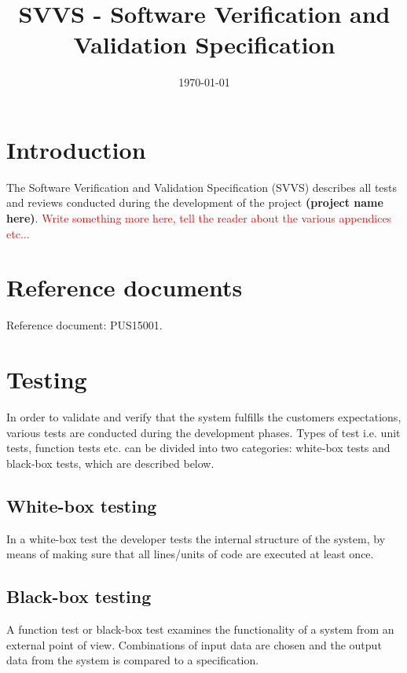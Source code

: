 \documentclass[a4paper]{article}
\title{SVVS - Software Verification and Validation Specification}
\date{\today}
\begin{document}
\maketitle


\pagebreak
\setcounter{tocdepth}{2}
\tableofcontents
\pagebreak

\section{Introduction}
The Software Verification and Validation Specification (SVVS) describes all tests and reviews conducted during the development of the project \textbf{(project name here)}. \textcolor{red}{Write something more here, tell  the reader about the various appendices etc...}

\section{Reference documents}
Reference document: PUS15001.

\section{Testing}
In order to validate and verify that the system fulfills the customers expectations, various tests are conducted during the development phases. Types of test i.e. unit tests, function tests etc. can be divided into two categories: white-box tests and black-box tests, which are described below.   

\subsection{White-box testing}
In a white-box test the developer tests the internal structure of the system, by means of making sure that all lines/units of code are executed at least once.

\subsection{Black-box testing}
A function test or black-box test examines the functionality of a system from an external point of view. Combinations of input data are chosen and the output data from the system is compared to a specification.
\end{document}
